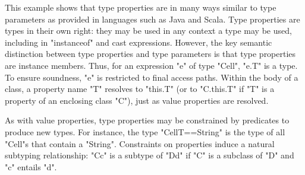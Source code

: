 This example shows that type properties are in many ways similar to
type parameters as provided in languages such as Java and Scala.
Type properties are types in their own right:
they may be used in any context a type may be used,
including in \xcd"instanceof" and cast expressions.
However, the key semantic distinction between type properties
and type parameters is that type properties are instance
members.
Thus, for an expression \xcd"e" of type \xcd"Cell", \xcd"e.T" is a type. 
To ensure
soundness, \xcd"e" is restricted to final access paths.
Within the body of a class, a property name \xcd"T" resolves
to \xcd"this.T" (or to \xcd"C.this.T" if \xcd"T" is a property of
an enclosing class \xcd"C"), just as value properties are
resolved.

As with value properties, type properties may be constrained
by predicates to produce new types.
For instance, the type \xcd"Cell{T==String}" is the type of
all \xcd"Cell"s that contain a \xcd"String".
Constraints on properties induce a natural subtyping relationship:
\xcd"C{c}" is a subtype of
\xcd"D{d}" if \xcd"C" is a subclass of \xcd"D" and
\xcd"c" entails \xcd"d".

